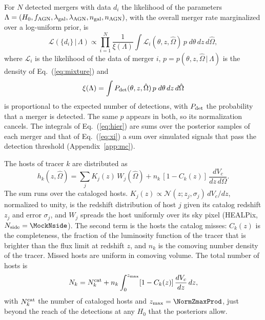 \documentclass[aps,prd,reprint,superscriptaddress,nofootinbib,nolongbibliography,floatfix]{revtex4-2}
\newcommand{\fagn}{f_{\rm AGN}}
\begin{document}
For $N$ detected mergers with data $d_i$ the likelihood of the parameters $\Lambda=(H_0,\fagn,\lambda_{\rm gal},\lambda_{\rm AGN},n_{\rm gal},n_{\rm AGN})$, with the overall merger rate marginalized over a log-uniform prior, is \cite{Loredo:2004nn,Mandel:2018mve,Vitale:2020aaz}
\begin{equation}
\mathcal{L}(\{d_i\}\,|\,\Lambda)\propto\prod_{i=1}^{N}\frac{1}{\xi(\Lambda)}\int\mathcal{L}_i(\theta,z,\hat\Omega)\,p\;d\theta\,dz\,d\hat\Omega,
\label{eq:hier}
\end{equation}
where $\mathcal{L}_i$ is the likelihood of the data of merger $i$, $p=p(\theta,z,\hat\Omega\,|\,\Lambda)$ is the density of Eq.~(\ref{eq:mixture}) and
\begin{equation}
\xi(\Lambda)=\int P_{\rm det}(\theta,z,\hat\Omega)\,p\;d\theta\,dz\,d\hat\Omega
\label{eq:xi}
\end{equation}
is proportional to the expected number of detections, with $P_{\rm det}$ the probability that a merger is detected.
The same $p$ appears in both, so its normalization cancels.
The integrals of Eq.~(\ref{eq:hier}) are sums over the posterior samples of each merger and that of Eq.~(\ref{eq:xi}) a sum over simulated signals that pass the detection threshold (Appendix~\ref{app:mc}).

The hosts of tracer $k$ are distributed as
\begin{equation}
h_k(z,\hat\Omega)=\sum_{j}K_j(z)\,W_j(\hat\Omega)+n_k\,[1-C_k(z)]\,\frac{dV_c}{dz\,d\Omega}.
\label{eq:hosts}
\end{equation}
The sum runs over the cataloged hosts.
$K_j(z)\propto\mathcal{N}(z;z_j,\sigma_j)\,dV_c/dz$, normalized to unity, is the redshift distribution of host $j$ given its catalog redshift $z_j$ and error $\sigma_j$, and $W_j$ spreads the host uniformly over its sky pixel (HEALPix, $N_{\rm side}=\MockNside$).
The second term is the hosts the catalog misses: $C_k(z)$ is the completeness, the fraction of the luminosity function of the tracer that is brighter than the flux limit at redshift $z$, and $n_k$ is the comoving number density of the tracer.
Missed hosts are uniform in comoving volume.
The total number of hosts is
\begin{equation}
N_k=N_k^{\rm cat}+n_k\int_0^{z_{\rm max}}[1-C_k(z)]\,\frac{dV_c}{dz}\,dz,
\label{eq:Nk}
\end{equation}
with $N_k^{\rm cat}$ the number of cataloged hosts and $z_{\rm max}=\NormZmaxProd$, just beyond the reach of the detections at any $H_0$ that the posteriors allow.
\end{document}

